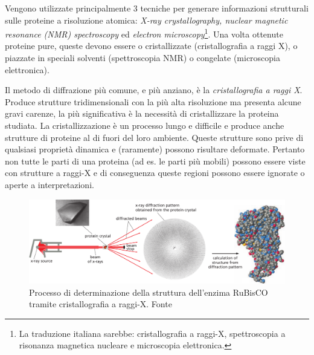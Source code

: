 {Vengono utilizzate principalmente 3 tecniche per generare informazioni strutturali sulle proteine a risoluzione atomica: \textit{X-ray crystallography, nuclear magnetic resonance (NMR) spectroscopy} ed \textit{electron microscopy}\footnote{La traduzione italiana sarebbe: cristallografia a raggi-X, spettroscopia a risonanza magnetica nucleare e microscopia elettronica.}. Una volta ottenute proteine pure, queste devono essere o cristallizzate (cristallografia a raggi X), o piazzate in speciali solventi (spettroscopia NMR) o congelate (microscopia elettronica). \\

\par Il metodo di diffrazione più comune, e più anziano, è la \textit{cristallografia a raggi X}. Produce strutture tridimensionali con la più alta risoluzione ma presenta alcune gravi carenze, la più significativa è la necessità di cristallizzare la proteina studiata. La cristallizzazione è un processo lungo e difficile e produce anche strutture di proteine al di fuori del loro ambiente. Queste strutture sono prive di qualsiasi proprietà dinamica e (raramente) possono risultare deformate. Pertanto non tutte le parti di una proteina (ad es. le parti più mobili) possono essere viste con strutture a raggi-X e di conseguenza queste regioni possono essere ignorate o aperte a interpretazioni.

\begin{figure}[!htb]
	\centering
	\includegraphics[scale=0.4]{images/cristallografia.png}
	\caption{Processo di determinazione della struttura dell'enzima RuBisCO tramite cristallografia a raggi-X. Fonte\cite{alberts2018essential}}
	\label{fig:cristallografia}
\end{figure}

}
